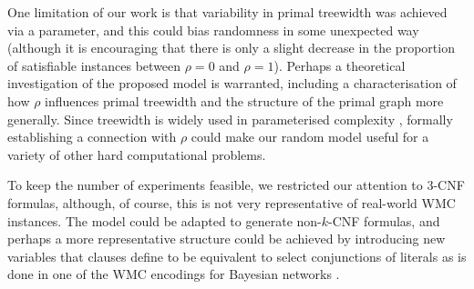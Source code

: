 One limitation of our work is that variability in primal treewidth was achieved
via a parameter, and this could bias randomness in some unexpected way (although
it is encouraging that there is only a slight decrease in the proportion of
satisfiable instances between $\rho=0$ and $\rho = 1$). Perhaps a theoretical
investigation of the proposed model is warranted, including a characterisation
of how $\rho$ influences primal treewidth and the structure of the primal graph
more generally. Since treewidth is widely used in parameterised complexity
\citep{DBLP:series/txcs/DowneyF13}, formally establishing a connection with
$\rho$ could make our random model useful for a variety of other hard
computational problems.

To keep the number of experiments feasible, we restricted our attention to 3-CNF
formulas, although, of course, this is not very representative of real-world
\textsf{WMC} instances. The model could be adapted to generate non-$k$-CNF
formulas, and perhaps a more representative structure could be achieved by
introducing new variables that clauses define to be equivalent to select
conjunctions of literals as is done in one of the \textsf{WMC} encodings for
Bayesian networks \citep{DBLP:conf/kr/Darwiche02}.

